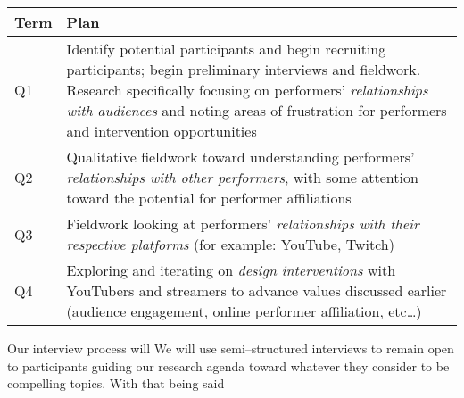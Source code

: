 \documentclass[10pt]{article}
\newcommand{\topic}[1]{{\color{Blue}#1}}
\renewcommand{\topic}[1]{{#1}}
\begin{document}
\begin{tabular}{p{2cm}|p{13cm}}
  \textbf{Term} & \textbf{Plan} \\
\hline
Q1  & Identify potential participants and begin recruiting participants;
      begin preliminary interviews and fieldwork.
      Research specifically focusing on performers' \textit{relationships with audiences}
      and noting areas of frustration for performers and intervention opportunities \\
\hline
Q2  & Qualitative fieldwork toward understanding performers' \textit{relationships with other performers},
      with some attention toward the potential for performer affiliations \\
\hline
Q3  & Fieldwork looking at performers' \textit{relationships with their respective platforms}
      (for example: YouTube, Twitch) \\
\hline
Q4  & Exploring and iterating on \textit{design interventions} with YouTubers and streamers
      to advance values discussed earlier
      (audience engagement, online performer affiliation, etc\dots)  \\
\end{tabular}

\topic{Our interview process will }
We will use semi--structured interviews
to remain open to participants guiding our research agenda toward
whatever they consider to be compelling topics.
With that being said
\end{document}
